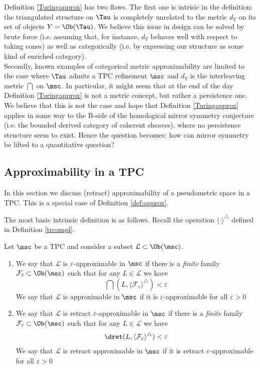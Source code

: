 \begin{remark}
    Definition \ref{Turingapprox} has two flaws. The first one is intrisic in the definition: the triangulated structure on $\Tau$ is completely unrelated to the metric $d_Y$ on its set of objects $Y=\Ob(\Tau)$. We believe this issue in design can be solved by brute force (i.e. assuming that, for instance, $d_Y$ behaves well with respect to taking cones) as well as categorically (i.e. by expressing our structure as some kind of enriched category). \\ Secondly, known examples of categorical metric approximability are limited to the case where $\Tau$ admits a TPC refinement $\msc$ and $d_Y$ is the interleaving metric $\dint$ on $\msc$. In particular, it might seem that at the end of the day Definition \ref{Turingapprox} is not a metric concept, but rather a persistence one. We believe that this is not the case and hope that Definition \ref{Turingapprox} applies in some way to the B-side of the homological mirror symmetry conjecture (i.e. the bounded derived category of coherent sheaves), where no persistence structure seem to exist. Hence the question becomes: how can mirror symmetry be lifted to a quantitative question?
\end{remark}




\subsection{Approximability in a TPC}
In this section we discuss (retract) approximability of a pseudometric space in a TPC. This is a special case of Definition \ref{def:approx}. 

The most basic intrinsic definition is as follows. Recall the operation $\langle\cdot\rangle^\triangle$ defined in Definition \ref{trcompl}.
\begin{dfn}\label{def:TPCapprox}
    Let $\msc$ be a TPC and consider a subset $\mathcal{L}\subset \Ob(\msc)$. 
    \begin{enumerate}
    \item We say that $\mathcal{L}$ is $\varepsilon$-approximable in $\msc$ if there is a \textit{finite} family $\mathcal{F}_\varepsilon\subset\Ob(\msc)$ such that for any $L\in \mathcal{L}$ we have $$\dint(L,\langle\mathcal{F}_\varepsilon\rangle^\triangle)<\varepsilon$$ 
    We say that $\mathcal{L}$ is approximable in $\msc$ if it is $\varepsilon$-approximable for all $\varepsilon>0$
    \item We say that $\mathcal{L}$ is retract $\varepsilon$-approximable in $\msc$ if there is a \textit{finite} family $\mathcal{F}_\varepsilon\subset\Ob(\msc)$ such that for any $L\in \mathcal{L}$ we have $$\dret(L,\langle\mathcal{F}_\varepsilon\rangle^\triangle)<\varepsilon$$ 
    We say that $\mathcal{L}$ is retract approximable in $\msc$ if it is retract $\varepsilon$-approximable for all $\varepsilon>0$
    \end{enumerate}
\end{dfn}

